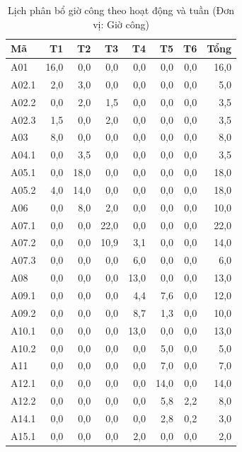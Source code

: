 \begin{table}[H]
\centering
\caption{Lịch phân bổ giờ công theo hoạt động và tuần (Đơn vị: Giờ công)}\label{tab:ledger}
\begingroup\footnotesize
\setlength{\tabcolsep}{2pt}\renewcommand{\arraystretch}{1.18}
\begin{minipage}[t]{.46\linewidth}
\vspace{0pt}\centering
\begin{tabular*}{\linewidth}{@{\extracolsep{\fill}}lrrrrrrr@{}}
\toprule
\textbf{Mã} & \textbf{T1} & \textbf{T2} & \textbf{T3} & \textbf{T4} & \textbf{T5} & \textbf{T6} & \textbf{Tổng} \\
\midrule
A01 & 16,0 & 0,0 & 0,0 & 0,0 & 0,0 & 0,0 & 16,0 \\
A02.1 & 2,0 & 3,0 & 0,0 & 0,0 & 0,0 & 0,0 & 5,0 \\
A02.2 & 0,0 & 2,0 & 1,5 & 0,0 & 0,0 & 0,0 & 3,5 \\
A02.3 & 1,5 & 0,0 & 2,0 & 0,0 & 0,0 & 0,0 & 3,5 \\
A03 & 8,0 & 0,0 & 0,0 & 0,0 & 0,0 & 0,0 & 8,0 \\
A04.1 & 0,0 & 3,5 & 0,0 & 0,0 & 0,0 & 0,0 & 3,5 \\
A05.1 & 0,0 & 18,0 & 0,0 & 0,0 & 0,0 & 0,0 & 18,0 \\
A05.2 & 4,0 & 14,0 & 0,0 & 0,0 & 0,0 & 0,0 & 18,0 \\
A06 & 0,0 & 8,0 & 2,0 & 0,0 & 0,0 & 0,0 & 10,0 \\
A07.1 & 0,0 & 0,0 & 22,0 & 0,0 & 0,0 & 0,0 & 22,0 \\
A07.2 & 0,0 & 0,0 & 10,9 & 3,1 & 0,0 & 0,0 & 14,0 \\
A07.3 & 0,0 & 0,0 & 0,0 & 6,0 & 0,0 & 0,0 & 6,0 \\
A08 & 0,0 & 0,0 & 0,0 & 13,0 & 0,0 & 0,0 & 13,0 \\
A09.1 & 0,0 & 0,0 & 0,0 & 4,4 & 7,6 & 0,0 & 12,0 \\
A09.2 & 0,0 & 0,0 & 0,0 & 8,7 & 1,3 & 0,0 & 10,0 \\
A10.1 & 0,0 & 0,0 & 0,0 & 13,0 & 0,0 & 0,0 & 13,0 \\
A10.2 & 0,0 & 0,0 & 0,0 & 0,0 & 5,0 & 0,0 & 5,0 \\
A11 & 0,0 & 0,0 & 0,0 & 0,0 & 7,0 & 0,0 & 7,0 \\
A12.1 & 0,0 & 0,0 & 0,0 & 0,0 & 14,0 & 0,0 & 14,0 \\
A12.2 & 0,0 & 0,0 & 0,0 & 0,0 & 5,8 & 2,2 & 8,0 \\
A14.1 & 0,0 & 0,0 & 0,0 & 0,0 & 2,8 & 0,2 & 3,0 \\
A15.1 & 0,0 & 0,0 & 0,0 & 2,0 & 0,0 & 0,0 & 2,0 \\

\end{tabular*}
\end{minipage}
\end{table}
